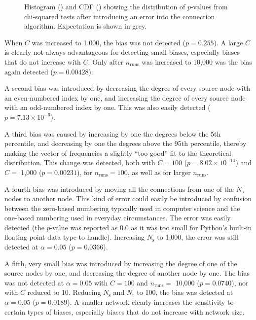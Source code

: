 \begin{figure}[b]
\begin{subfigure}[b]{0.49\textwidth}
    \label{subfig:bias_CDF}
\end{subfigure}
\caption[Distribution of $p$-values after introducing a bias into the connection algorithm]{Histogram () and CDF () showing the distribution of $p$-values from chi-squared tests after introducing an error into the connection algorithm. Expectation is shown in grey.}
\label{fig:bias_example}
\end{figure} 

When $C$ was increased to 1,000, the bias was not detected ($p = 0.255$). A large $C$ is clearly not always advantageous for detecting small biases, especially biases that do not increase with $C$. Only after $n_\text{runs}$ was increased to 10,000 was the bias again detected ($p = 0.00428$). 

A second bias was introduced by decreasing the degree of every source node with an even-numbered index by one, and increasing the degree of every source node with an odd-numbered index by one. This was also easily detected ($p = 7.13 \times 10^{-6}$).

A third bias was caused by increasing by one the degrees below the 5th percentile, and decreasing by one the degrees above the 95th percentile, thereby making the vector of frequencies a slightly ``too good'' fit to the theoretical distribution. This change was detected, both with $C = 100$ ($p = 8.02 \times 10^{-14}$) and $C =$ 1,000 ($p = 0.00231$), for $n_\text{runs} = 100$, as well as for larger $n_\text{runs}$. 

A fourth bias was introduced by moving all the connections from one of the $N_\text{s}$ nodes to another node. This kind of error could easily be introduced by confusion between the zero-based numbering typically used in computer science and the one-based numbering used in everyday circumstances. The error was easily detected (the $p$-value was reported as $0.0$ as it was too small for Python's built-in floating point data type to handle). Increasing $N_\text{s}$ to 1,000, the error was still detected at $\alpha = 0.05$ ($p = 0.0366$).
	
A fifth, very small bias was introduced by increasing the degree of one of the source nodes by one, and decreasing the degree of another node by one. The bias was not detected at $\alpha = 0.05$ with $C = 100$ and $n_\text{runs} =$ 10,000 ($p = 0.0740$), nor with $C$ reduced to 10. Reducing $N_\text{s}$ and $N_\text{t}$ to 100, the bias was detected at $\alpha = 0.05$ ($p = 0.0189$). A smaller network clearly increases the sensitivity to certain types of biases, especially biases that do not increase with network size.

